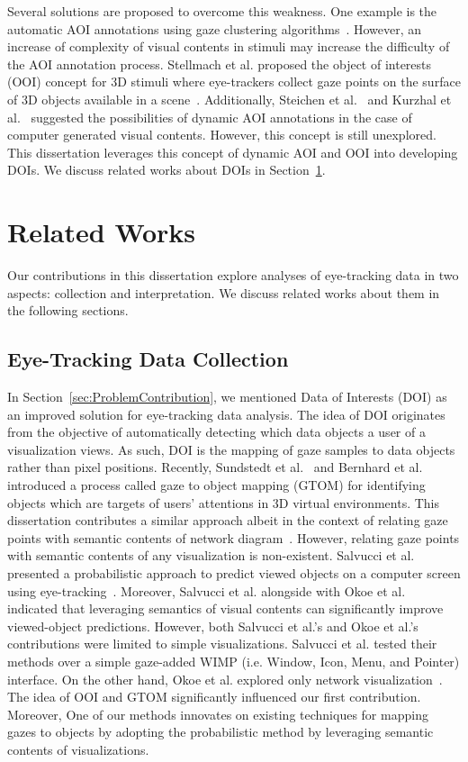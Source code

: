 Several solutions are proposed to overcome this weakness. One example is the automatic AOI annotations using gaze clustering algorithms~\cite{Pri00, San04, Dru14}. However, an increase of complexity of visual contents in stimuli may increase the difficulty of the AOI annotation process. Stellmach et al. proposed the object of interests (OOI) concept for 3D stimuli where eye-trackers collect gaze points on the surface of 3D objects available in a scene~\cite{Ste10}. Additionally, Steichen et al.~\cite{Ste13} and Kurzhal et al.~\cite{Kur14} suggested the possibilities of dynamic AOI annotations in the case of computer generated visual contents. However, this concept is still unexplored. This dissertation leverages this concept of dynamic AOI and OOI into developing DOIs. We discuss related works about DOIs in Section~\ref{sec:RelatedWorks}.

\section{Related Works}
\label{sec:RelatedWorks}
Our contributions in this dissertation explore analyses of eye-tracking data in two aspects: collection and interpretation. We discuss related works about them in the following sections.

\subsection{Eye-Tracking Data Collection} 
In Section~\ref{sec:ProblemContribution}, we mentioned Data of Interests (DOI) as an improved solution for eye-tracking data analysis. The idea of DOI originates from the objective of automatically detecting which data objects a user of a visualization views. As such, DOI is the mapping of gaze samples to data objects rather than pixel positions. Recently, Sundstedt et al.~\cite{Sun13} and Bernhard et al.~\cite{Bern14} introduced a process called gaze to object mapping (GTOM) for identifying objects which are targets of users' attentions in 3D virtual environments. This dissertation contributes a similar approach albeit in the context of relating gaze points with semantic contents of network diagram~\cite{Okoe14}. However, relating gaze points with semantic contents of any visualization is non-existent. Salvucci et al. presented a probabilistic approach to predict viewed objects on a computer screen using eye-tracking~\cite{Sal00}. Moreover, Salvucci et al. alongside with Okoe et al.~\cite{Okoe14} indicated that leveraging semantics of visual contents can significantly improve viewed-object predictions. However, both Salvucci et al.'s and Okoe et al.'s contributions were limited to simple visualizations. Salvucci et al. tested their methods over a simple gaze-added WIMP (i.e. Window, Icon, Menu, and Pointer) interface. On the other hand, Okoe et al. explored only network visualization~\cite{Okoe14}. The idea of OOI and GTOM significantly influenced our first contribution. Moreover, One of our methods innovates on existing techniques for mapping gazes to objects by adopting the probabilistic method by leveraging semantic contents of visualizations.  


